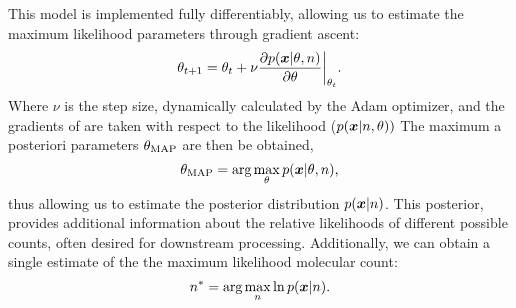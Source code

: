   This model is implemented fully differentiably, allowing us to estimate 
  the maximum likelihood parameters through gradient ascent:
  \begin{align}
    \theta_{t+1} = \theta_{t} + \nu \frac{\partial p(\bm{x} | \theta, n)}{\partial \theta}
    \bigg\rvert_{\theta_{t}}
    \notag
    \text{.}
  \end{align}
  Where $\nu$ is the step size, dynamically calculated by the Adam optimizer, and 
  the gradients of \parameters are taken with respect to the likelihood ($p(\bm{x} | n, \theta))$
  The maximum a posteriori parameters $\theta_\text{MAP}$ are then be obtained,
  \begin{equation}
    \theta_\text{MAP} = \text{arg}\max_{\theta} p(\bm{x} | \theta, n)
    \text{,}
  \end{equation}
 thus allowing us to estimate the posterior distribution $p(\bm{x}|n)$. 
This posterior, provides additional information about the relative likelihoods 
of different possible counts, often desired for downstream processing. 
Additionally, we can obtain a single estimate of the the maximum likelihood molecular count:
  \begin{equation}
      n^* =
      \text{arg}\max_{n}
        \ln p(\bm{x} | n)
    \text{.}
    \label{eq:method:optimization}
  \end{equation}
